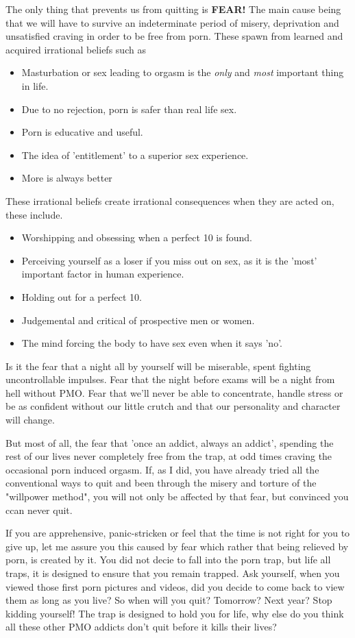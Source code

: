 \documentclass[easypeasy.tex]{subfiles}
\begin{document}
The only thing that prevents us from quitting is \textbf{FEAR!} The main cause being that we will have to survive an indeterminate period of misery, deprivation and unsatisfied craving in order to be free from porn. These spawn from learned and acquired irrational beliefs such as
    \begin{itemize}
      \item Masturbation or sex leading to orgasm is the \textit{only} and \textit{most} important thing in life.
      \item Due to no rejection, porn is safer than real life sex.
      \item Porn is educative and useful.
  \item The idea of 'entitlement' to a superior sex experience.
  \item More is always better
    \end{itemize}
These irrational beliefs create irrational consequences when they are acted on, these include.
  \begin{itemize}
    \item Worshipping and obsessing when a perfect 10 is found.
    \item Perceiving yourself as a loser if you miss out on sex, as it is the 'most' important factor in human experience.
    \item Holding out for a perfect 10.
    \item Judgemental and critical of prospective men or women.
    \item The mind forcing the body to have sex even when it says 'no'.
  \end{itemize}
Is it the fear that a night all by yourself will be miserable, spent fighting uncontrollable impulses. Fear that the night before exams will be a night from hell without PMO. Fear that we'll never be able to concentrate, handle stress or be as confident without our little crutch and that our personality and character will change.

But most of all, the fear that 'once an addict, always an addict', spending the rest of our lives never completely free from the trap, at odd times craving the occasional porn induced orgasm. If, as I did, you have already tried all the conventional ways to quit and been through the misery and torture of the "willpower method", you will not only be affected by that fear, but convinced you ccan never quit.

If you are apprehensive, panic-stricken or feel that the time is not right for you to give up, let me assure you this caused by fear which rather that being relieved by porn, is created by it. You did not decie to fall into the porn trap, but life all traps, it is designed to ensure that you remain trapped. Ask yourself, when you viewed those first porn pictures and videos, did you decide to come back to view them as long as you live? So when will you quit? Tomorrow? Next year? Stop kidding yourself! The trap is designed to hold you for life, why else do you think all these other PMO addicts don't quit before it kills their lives?
\end{document}
